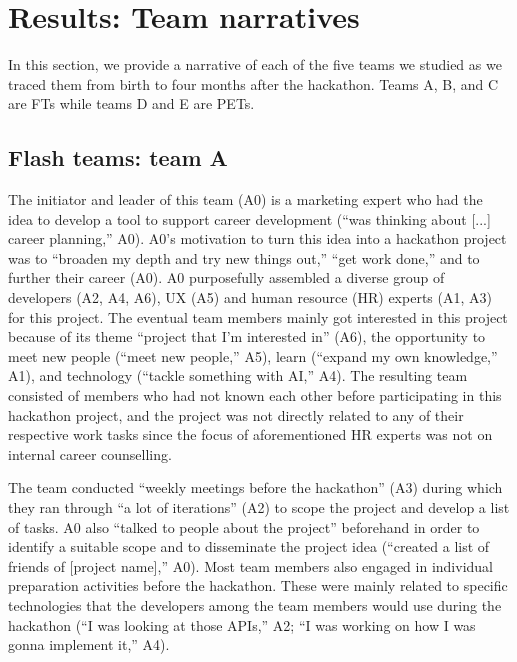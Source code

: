 \documentclass{hcij}
\begin{document}
\section{Results: Team narratives}
In this section, we provide a narrative of each of the five teams we studied as we traced them from birth to four months after the hackathon. Teams A, B, and C are FTs while teams D and E are PETs.

\subsection{Flash teams: team A}
The initiator and leader of this team (A0) is a marketing expert who had the idea to develop a tool to support career development (“was thinking about [...] career planning,” A0). A0’s motivation to turn this idea into a hackathon project was to “broaden my depth and try new things out,” “get work done,” and to further their career (A0). A0 purposefully assembled a diverse group of developers (A2, A4, A6), UX (A5) and human resource (HR) experts (A1, A3) for this project. The eventual team members mainly got interested in this project because of its theme “project that I’m interested in” (A6), the opportunity to meet new people (“meet new people,” A5), learn (“expand my own knowledge,” A1), and technology (“tackle something with AI,” A4). The resulting team consisted of members who had not known each other before participating in this hackathon project, and the project was not directly related to any of their respective work tasks since the focus of aforementioned HR experts was not on internal career counselling.

The team conducted “weekly meetings before the hackathon” (A3) during which they ran through “a lot of iterations” (A2) to scope the project and develop a list of tasks. A0 also “talked to people about the project” beforehand in order to identify a suitable scope and to disseminate the project idea (“created a list of friends of [project name],” A0). Most team members also engaged in individual preparation activities before the hackathon. These were mainly related to specific technologies that the developers among the team members would use during the hackathon (“I was looking at those APIs,” A2; “I was working on how I was gonna implement it,” A4).
\end{document}
